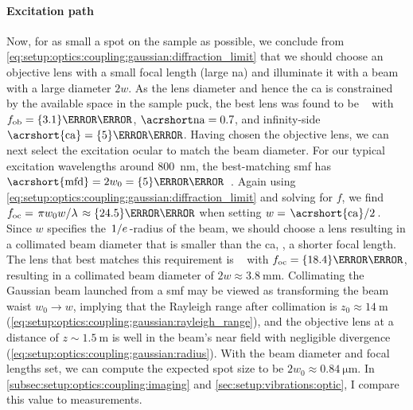 \paragraph{Excitation path}
Now, for as small a spot on the sample as possible, we conclude from \cref{eq:setup:optics:coupling:gaussian:diffraction_limit} that we should choose an objective lens with a small focal length \fob (large \acrshort{na}) and illuminate it with a beam with a large diameter $2 w$.
As the lens diameter and hence the \acrfull{ca}
is constrained by the available space in the sample puck, the best lens was found to be \objectivelens~\cite{Thorlabs354330} with $\fob = \qty{3.1}{\milli\meter}$, $\NA = \num{0.7}$, and infinity-side $\mr{\acrshort{ca}} = \qty{5}{\milli\meter}$.
Having chosen the objective lens, we can next select the excitation ocular to match the beam diameter.
For our typical excitation wavelengths around \qty{800}{\nano\meter}, the best-matching \gls{smf} has $\mr{\acrshort{mfd}} = 2 w_0 = \qty{5}{\micro\meter}$~\cite{Thorlabs780HP}.
Again using \cref{eq:setup:optics:coupling:gaussian:diffraction_limit} and solving for $f$, we find $\foc = \flatfrac{\pi w_0 w}{\lambda} \approx \qty{24.5}{\milli\meter}$ when setting $w = \flatfrac{\mr{\acrshort{ca}}}{2}$.
Since $w$ specifies the $\flatfrac{1}{e}$-radius of the beam, we should choose a lens resulting in a collimated beam diameter that is smaller than the \gls{ca}, \ie, a shorter focal length.
The lens that best matches this requirement is \ocularlens~\cite{ThorlabsA280TM} with $\foc = \qty{18.4}{\milli\meter}$, resulting in a collimated beam diameter of $2 w \approx\qty{3.8}{\milli\meter}$.
Collimating the Gaussian beam launched from a \gls{smf} may be viewed as transforming the beam waist $w_0\to w$, implying that the Rayleigh range after collimation is $z_0\approx\qty{14}{\meter}$ (\cref{eq:setup:optics:coupling:gaussian:rayleigh_range}), and the objective lens at a distance of $z\sim\qty{1.5}{\meter}$ is well in the beam's near field with negligible divergence (\cf \cref{eq:setup:optics:coupling:gaussian:radius}).
With the beam diameter and focal lengths set, we can compute the expected spot size to be $2 w_0\approx\qty{0.84}{\micro\meter}$.
In \cref{subsec:setup:optics:coupling:imaging} and \cref{sec:setup:vibrations:optic}, I compare this value to measurements.

